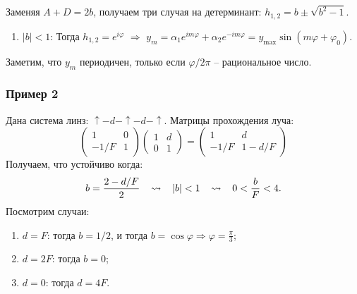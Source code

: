 Заменяя $A+D = 2b$, получаем три случая на детерминант: $h_{1,2} = b \pm \sqrt{b^2 - 1}$.
\begin{enumerate}
	\item $|b|<1$: Тогда $h_{1,2} = e^{i \varphi}$ $\Rightarrow$ $y_m = \alpha_1 e^{i m \varphi} + \alpha_2 e^{- i m \varphi} = y_{\text{max}} \sin (m \varphi + \varphi_0)$.
\end{enumerate}
Заметим, что $y_m$ периодичен, только если $\varphi/2\pi$ -- рациональное число.

\subsubsection*{Пример 2}
Дана система линз: $\uparrow-d-\uparrow-d-\uparrow$. Матрицы прохождения луча:
\begin{equation*}
	\begin{pmatrix}
		1 & 0 \\ -1/F & 1
	\end{pmatrix}
	\begin{pmatrix}
		1 & d \\ 0 & 1
	\end{pmatrix}
	=
	\begin{pmatrix}
		1 & d \\ -1/F & 1 - d/F
	\end{pmatrix}
\end{equation*}
Получаем, что устойчиво когда:
\begin{equation*}
	b = \frac{2- d/F}{2}
	\hspace{0.3 cm}
	\leadsto
	\hspace{0.3 cm}
	|b|<1
	\hspace{0.3 cm}
	\leadsto
	\hspace{0.3 cm}
	0 < \frac{b}{F} < 4.
\end{equation*}
Посмотрим случаи:
\begin{enumerate}
	\item $d = F$: тогда $b = 1/2$, и тогда $b = \cos \varphi \Rightarrow \varphi = \frac{\pi}{3}$;
	\item $d = 2 F$: тогда $b=0$;
	\item $d = 0$: тогда $d = 4F$.
\end{enumerate}

